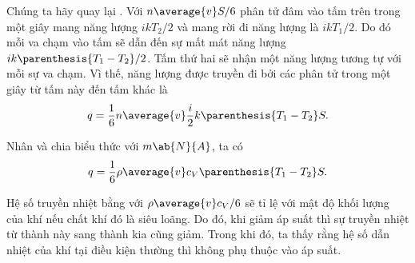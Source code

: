 Chúng ta hãy quay lại . Với $n\average{v}S/6$ phân tử đâm vào tấm trên trong một giây mang năng lượng $ikT_2/2$ và mang rời đi năng lượng là $ikT_1/2$. Do đó mỗi va chạm vào tấm sẽ dẫn đến sự mất mát năng lượng $ik\parenthesis{T_1-T_2}/2$. Tấm thứ hai sẽ nhận một năng lượng tương tự với mỗi sự va chạm. Vì thế, năng lượng được truyền đi bởi các phân tử trong một giây từ tấm này đến tấm khác là
\begin{equation*}
    q = \frac{1}{6} n \average{v} \frac{i}{2} k \parenthesis{T_1-T_2} S.
\end{equation*}

\noindent
Nhân và chia biểu thức với $m\ab{N}{A}$, ta có
\begin{equation}\label{eq:16_32}
    q = \frac{1}{6} \rho \average{v} c_V \parenthesis{T_1-T_2} S.
\end{equation}

Hệ số truyền nhiệt bằng với $\rho\average{v}c_V/6$ sẽ tỉ lệ với mật độ khối lượng của khí nếu chất khí đó là siêu loãng. Do đó, khi giảm áp suất thì sự truyền nhiệt từ thành này sang thành kia cũng giảm. Trong khi đó, ta thấy rằng hệ số dẫn nhiệt của khí tại điều kiện thường thì không phụ thuộc vào áp suất.
